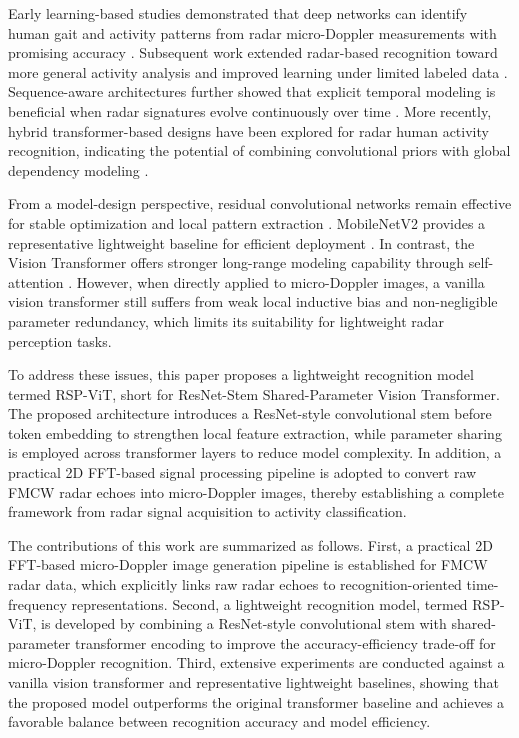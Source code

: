 \documentclass{svproc}
\begin{document}
Early learning-based studies demonstrated that deep networks can identify human gait and activity patterns from radar micro-Doppler measurements with promising accuracy \cite{Papanastasiou2021}. Subsequent work extended radar-based recognition toward more general activity analysis and improved learning under limited labeled data \cite{Li2022SemiHAR}. Sequence-aware architectures further showed that explicit temporal modeling is beneficial when radar signatures evolve continuously over time \cite{Du2020SCGRNN}. More recently, hybrid transformer-based designs have been explored for radar human activity recognition, indicating the potential of combining convolutional priors with global dependency modeling \cite{Huan2023LHViT}.

From a model-design perspective, residual convolutional networks remain effective for stable optimization and local pattern extraction \cite{He2016ResNet}. MobileNetV2 provides a representative lightweight baseline for efficient deployment \cite{Sandler2018MobileNetV2}. In contrast, the Vision Transformer offers stronger long-range modeling capability through self-attention \cite{Dosovitskiy2021ViT}. However, when directly applied to micro-Doppler images, a vanilla vision transformer still suffers from weak local inductive bias and non-negligible parameter redundancy, which limits its suitability for lightweight radar perception tasks.

To address these issues, this paper proposes a lightweight recognition model termed RSP-ViT, short for ResNet-Stem Shared-Parameter Vision Transformer. The proposed architecture introduces a ResNet-style convolutional stem before token embedding to strengthen local feature extraction, while parameter sharing is employed across transformer layers to reduce model complexity. In addition, a practical 2D FFT-based signal processing pipeline is adopted to convert raw FMCW radar echoes into micro-Doppler images, thereby establishing a complete framework from radar signal acquisition to activity classification.

The contributions of this work are summarized as follows. First, a practical 2D FFT-based micro-Doppler image generation pipeline is established for FMCW radar data, which explicitly links raw radar echoes to recognition-oriented time-frequency representations. Second, a lightweight recognition model, termed RSP-ViT, is developed by combining a ResNet-style convolutional stem with shared-parameter transformer encoding to improve the accuracy-efficiency trade-off for micro-Doppler recognition. Third, extensive experiments are conducted against a vanilla vision transformer and representative lightweight baselines, showing that the proposed model outperforms the original transformer baseline and achieves a favorable balance between recognition accuracy and model efficiency.
\end{document}

